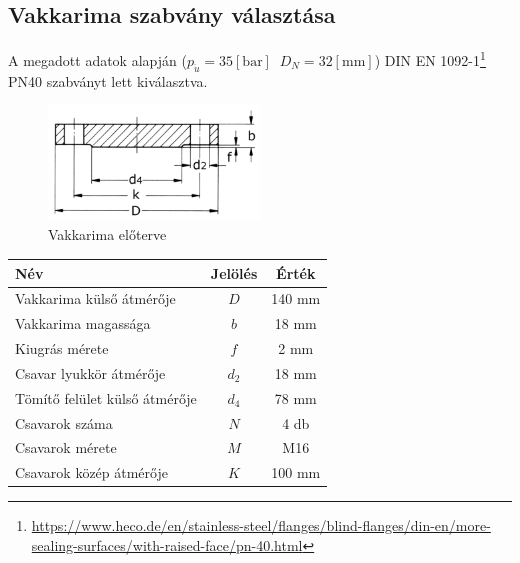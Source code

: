 \documentclass[10pt, a4paper]{article}
\newcommand{\baar}{\mathrm{\left[bar\right]}}
\newcommand{\mm}{\mathrm{\left[mm\right]}}
\begin{document}
	\subsection{Vakkarima szabvány választása}
	A megadott adatok alapján ($p_{\ddot{u}} = 35\baar\;\;D_N = 32\mm$) DIN EN 1092-1\footnote{\url{https://www.heco.de/en/stainless-steel/flanges/blind-flanges/din-en/more-sealing-surfaces/with-raised-face/pn-40.html}} PN40 szabványt lett kiválasztva.
	\begin{figure}[h]
		\centering
		\includegraphics[width=0.5\textwidth]{ vakkarima_eloterv.png }
		\caption{Vakkarima előterve}
		\label{fig:vakkarima}
	\end{figure}
	\renewcommand{\arraystretch}{1.4}
	\begin{table}[h]
		\centering
		\begin{tabular}{l|c|c}
			\textbf{Név}                              & \textbf{Jelölés} & \textbf{Érték} \\ \hline
			Vakkarima külső átmérője                     & $D$                & 140 mm           \\
			Vakkarima magassága                          & $b$                & 18 mm			\\
			Kiugrás mérete                            & $f$                & 2 mm           \\
			Csavar lyukkör átmérője                   & $d_2$             & 18 mm           \\
			Tömítő felület külső átmérője             & $d_4$             & 78 mm           \\
			Csavarok száma                            & $N$                & 4 db           \\
			Csavarok mérete                           & $M$                & M16          \\ 
			Csavarok közép átmérője                   & $K$                & 100 mm             
		\end{tabular}
	\end{table}
	\renewcommand{\arraystretch}{1}
\end{document}
